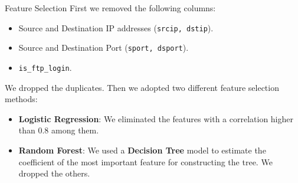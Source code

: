 \documentclass[12pt,aspectratio=169,notheorems]{beamer}
\begin{document}
\begin{frame}{Feature Selection}
    First we removed the following columns:
    \begin{itemize}
        \item Source and Destination IP addresses (\texttt{srcip, dstip}).
        \item Source and Destination Port (\texttt{sport, dsport}).
        \item \texttt{is\_ftp\_login}.
    \end{itemize}
    We dropped the duplicates. Then we adopted two different feature selection methods:
    \begin{itemize}
        \item \textbf{Logistic Regression}: We eliminated the features with a correlation higher than 0.8 among them.
        \item \textbf{Random Forest}: We used a \textbf{Decision Tree} model to estimate the coefficient of the most important feature for constructing the tree. We dropped the others.
    \end{itemize}
\end{frame}
\end{document}
